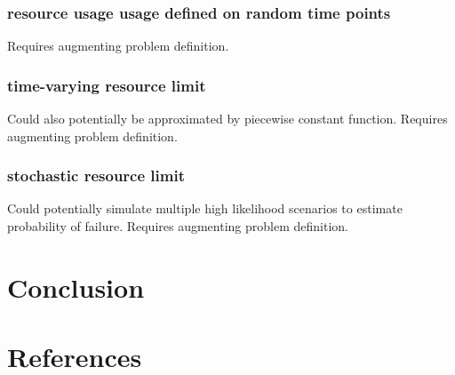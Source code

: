 \documentclass{article}
\begin{document}
\begin{multicols}{2}
\subsubsection{resource usage usage defined on random time points}
Requires augmenting problem definition.
\subsubsection{time-varying resource limit}
Could also potentially be approximated by piecewise constant function. Requires augmenting problem definition.
\subsubsection{stochastic resource limit}
Could potentially simulate multiple high likelihood scenarios to estimate probability of failure. Requires augmenting problem definition.%
\section{Conclusion}
\blindtext[5]
\section{References}


\end{multicols}
\end{document}
